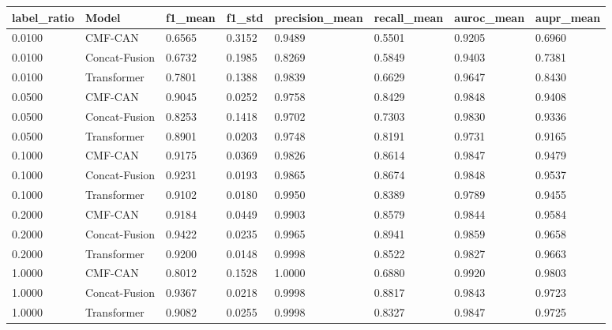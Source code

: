 \begin{tabular}{llllllll}
\toprule
label_ratio & Model & f1_mean & f1_std & precision_mean & recall_mean & auroc_mean & aupr_mean \\
\midrule
0.0100 & CMF-CAN & 0.6565 & 0.3152 & 0.9489 & 0.5501 & 0.9205 & 0.6960 \\
0.0100 & Concat-Fusion & 0.6732 & 0.1985 & 0.8269 & 0.5849 & 0.9403 & 0.7381 \\
0.0100 & Transformer & 0.7801 & 0.1388 & 0.9839 & 0.6629 & 0.9647 & 0.8430 \\
0.0500 & CMF-CAN & 0.9045 & 0.0252 & 0.9758 & 0.8429 & 0.9848 & 0.9408 \\
0.0500 & Concat-Fusion & 0.8253 & 0.1418 & 0.9702 & 0.7303 & 0.9830 & 0.9336 \\
0.0500 & Transformer & 0.8901 & 0.0203 & 0.9748 & 0.8191 & 0.9731 & 0.9165 \\
0.1000 & CMF-CAN & 0.9175 & 0.0369 & 0.9826 & 0.8614 & 0.9847 & 0.9479 \\
0.1000 & Concat-Fusion & 0.9231 & 0.0193 & 0.9865 & 0.8674 & 0.9848 & 0.9537 \\
0.1000 & Transformer & 0.9102 & 0.0180 & 0.9950 & 0.8389 & 0.9789 & 0.9455 \\
0.2000 & CMF-CAN & 0.9184 & 0.0449 & 0.9903 & 0.8579 & 0.9844 & 0.9584 \\
0.2000 & Concat-Fusion & 0.9422 & 0.0235 & 0.9965 & 0.8941 & 0.9859 & 0.9658 \\
0.2000 & Transformer & 0.9200 & 0.0148 & 0.9998 & 0.8522 & 0.9827 & 0.9663 \\
1.0000 & CMF-CAN & 0.8012 & 0.1528 & 1.0000 & 0.6880 & 0.9920 & 0.9803 \\
1.0000 & Concat-Fusion & 0.9367 & 0.0218 & 0.9998 & 0.8817 & 0.9843 & 0.9723 \\
1.0000 & Transformer & 0.9082 & 0.0255 & 0.9998 & 0.8327 & 0.9847 & 0.9725 \\
\bottomrule
\end{tabular}
